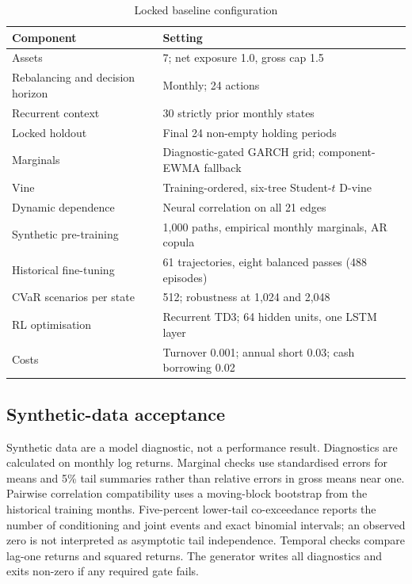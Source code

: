 \begin{table}[H]
\centering
\caption{Locked baseline configuration}
\label{tab:configuration}
\begin{tabular}{ll}
\toprule
Component & Setting \\
\midrule
Assets & 7; net exposure 1.0, gross cap 1.5 \\
Rebalancing and decision horizon & Monthly; 24 actions \\
Recurrent context & 30 strictly prior monthly states \\
Locked holdout & Final 24 non-empty holding periods \\
Marginals & Diagnostic-gated GARCH grid; component-EWMA fallback \\
Vine & Training-ordered, six-tree Student-$t$ D-vine \\
Dynamic dependence & Neural correlation on all 21 edges \\
Synthetic pre-training & 1,000 paths, empirical monthly marginals, AR copula \\
Historical fine-tuning & 61 trajectories, eight balanced passes (488 episodes) \\
CVaR scenarios per state & 512; robustness at 1,024 and 2,048 \\
RL optimisation & Recurrent TD3; 64 hidden units, one LSTM layer \\
Costs & Turnover 0.001; annual short 0.03; cash borrowing 0.02 \\
\bottomrule
\end{tabular}
\end{table}

\subsection{Synthetic-data acceptance}

Synthetic data are a model diagnostic, not a performance result. Diagnostics
are calculated on monthly log returns. Marginal checks use standardised errors
for means and 5\% tail summaries rather than relative errors in gross means near
one. Pairwise correlation compatibility uses a moving-block bootstrap from the
historical training months. Five-percent lower-tail co-exceedance reports the
number of conditioning and joint events and exact binomial intervals; an
observed zero is not interpreted as asymptotic tail independence. Temporal
checks compare lag-one returns and squared returns. The generator writes all
diagnostics and exits non-zero if any required gate fails.

